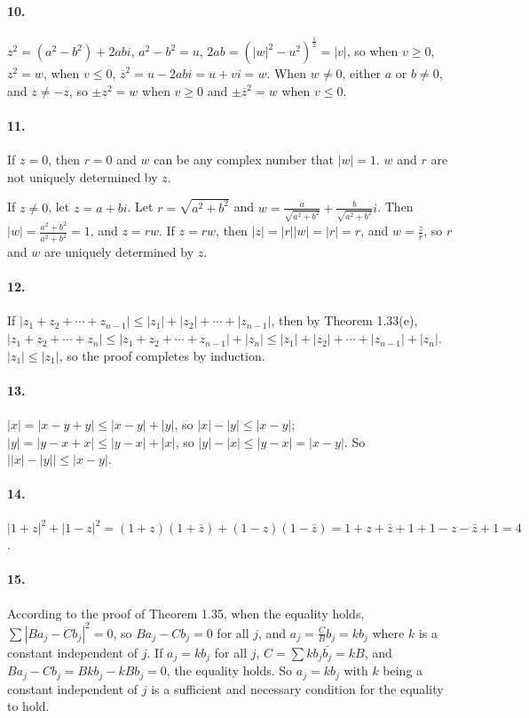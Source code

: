 \documentclass[a4paper]{article}
\begin{document}
\paragraph{10.}
$z^2=(a^2-b^2)+2abi$, $a^2-b^2=u$, $2ab=(|w|^2-u^2)^{\frac{1}{2}}=|v|$, so when $v\geq 0$, $z^2=w$, when $v\leq 0$, $\overline{z}^2=u-2abi=u+vi=w$. When $w\neq 0$, either $a$ or $b\neq 0$, and $z\neq -z$, so $\pm z^2=w$ when $v\geq 0$ and $\pm \overline{z}^2=w$ when $v\leq 0$.

\paragraph{11.}
If $z=0$, then $r=0$ and $w$ can be any complex number that $|w|=1$. $w$ and $r$ are not uniquely determined by $z$.
\medskip

If $z\neq 0$, let $z=a+bi$. Let $r=\sqrt{a^2+b^2}$ and $w=\frac{a}{\sqrt{a^2+b^2}}+\frac{b}{\sqrt{a^2+b^2}}i$. Then $|w|=\frac{a^2+b^2}{a^2+b^2}=1$, and $z=rw$.
If $z=rw$, then $|z|=|r||w|=|r|=r$, and $w=\frac{z}{r}$, so $r$ and $w$ are uniquely determined by $z$.

\paragraph{12.}
If $|z_1+z_2+\cdots+z_{n-1}|\leq |z_1|+|z_2|+\cdots+|z_{n-1}|$, then by Theorem 1.33(e), $|z_1+z_2+\cdots+z_n|\leq |z_1+z_2+\cdots+z_{n-1}|+|z_n|\leq|z_1|+|z_2|+\cdots+|z_{n-1}|+|z_n|$. $|z_1|\leq|z_1|$, so the proof completes by induction.

\paragraph{13.}
$|x|=|x-y+y|\leq|x-y|+|y|$, so $|x|-|y|\leq|x-y|$; $|y|=|y-x+x|\leq|y-x|+|x|$, so $|y|-|x|\leq|y-x|=|x-y|$. So $\left||x|-|y| \right|\leq|x-y|$.

\paragraph{14.}
$|1+z|^2+|1-z|^2=(1+z)(1+\bar{z})+(1-z)(1-\bar{z})=1+z+\bar{z}+1+1-z-\bar{z}+1=4$.

\paragraph{15.}
According to the proof of Theorem 1.35, when the equality holds, $\sum|Ba_j-Cb_j|^2=0$, so $Ba_j-Cb_j=0$ for all $j$, and $a_j=\frac{C}{B}b_j=kb_j$ where $k$ is a constant independent of $j$. If $a_j=kb_j$ for all $j$, $C=\sum kb_j\bar{b_j}=kB$, and $Ba_j-Cb_j=Bkb_j-kBb_j=0$, the equality holds. So $a_j=kb_j$ with $k$ being a constant independent of $j$ is a sufficient and necessary condition for the equality to hold. 
\end{document}
